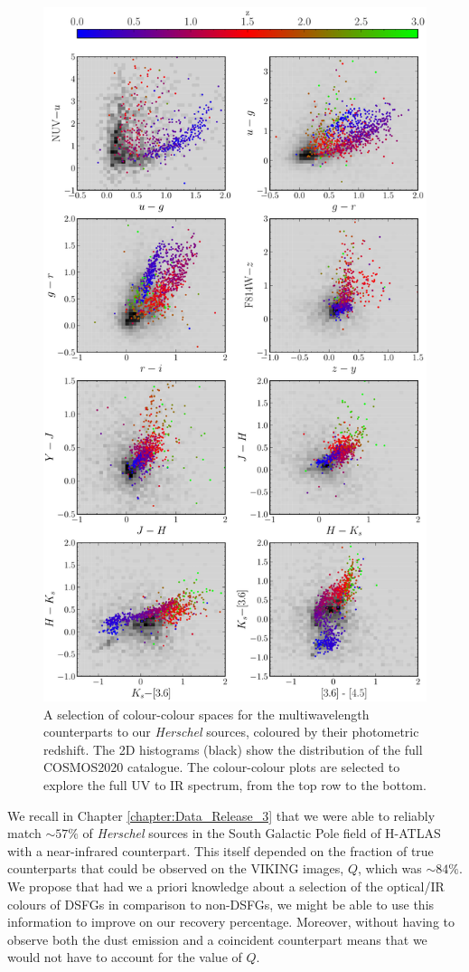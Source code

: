 \begin{figure}
	\centering
	\includegraphics[width=0.85\columnwidth, height=0.9\textheight]{Figures/smg_colours.pdf}
	\caption[Selection of colour-colour diagrams]{A selection of colour-colour spaces for the multiwavelength counterparts to our \textit{Herschel} sources, coloured by their photometric redshift. The 2D histograms (black) show the distribution of the full COSMOS2020 catalogue. The colour-colour plots are selected to explore the full UV to IR spectrum, from the top row to the bottom.}
	\label{fig:smg_colours}
\end{figure}

We recall in Chapter \ref{chapter:Data_Release_3} that we were able to reliably match $\sim 57\%$ of \textit{Herschel} sources in the South Galactic Pole field of H-ATLAS with a near-infrared counterpart. This itself depended on the fraction of true counterparts that could be observed on the VIKING images, $Q$, which was $\sim 84\%$. We propose that had we a priori knowledge about a selection of the optical/IR colours of DSFGs in comparison to non-DSFGs, we might be able to use this information to improve on our recovery percentage. Moreover, without having to observe both the dust emission and a coincident counterpart means that we would not have to account for the value of $Q$.


